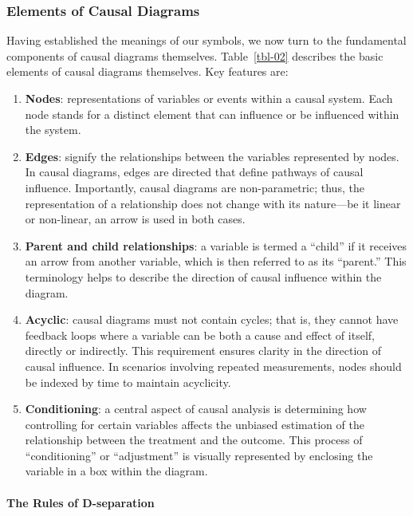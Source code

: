 \documentclass[
  singlecolumn]{article}
\let\oldparagraph\paragraph
\renewcommand{\paragraph}[1]{\oldparagraph{#1}\mbox{}}
\begin{document}
\subsubsection{Elements of Causal
Diagrams}\label{elements-of-causal-diagrams}

Having established the meanings of our symbols, we now turn to the
fundamental components of causal diagrams themselves. Table~\ref{tbl-02}
describes the basic elements of causal diagrams themselves. Key features
are:

\begin{enumerate}
\def\labelenumi{\arabic{enumi}.}
\item
  \textbf{Nodes}: representations of variables or events within a causal
  system. Each node stands for a distinct element that can influence or
  be influenced within the system.
\item
  \textbf{Edges}: signify the relationships between the variables
  represented by nodes. In causal diagrams, edges are directed that
  define pathways of causal influence. Importantly, causal diagrams are
  non-parametric; thus, the representation of a relationship does not
  change with its nature---be it linear or non-linear, an arrow is used
  in both cases.
\item
  \textbf{Parent and child relationships}: a variable is termed a
  ``child'' if it receives an arrow from another variable, which is then
  referred to as its ``parent.'' This terminology helps to describe the
  direction of causal influence within the diagram.
\item
  \textbf{Acyclic}: causal diagrams must not contain cycles; that is,
  they cannot have feedback loops where a variable can be both a cause
  and effect of itself, directly or indirectly. This requirement ensures
  clarity in the direction of causal influence. In scenarios involving
  repeated measurements, nodes should be indexed by time to maintain
  acyclicity.
\item
  \textbf{Conditioning}: a central aspect of causal analysis is
  determining how controlling for certain variables affects the unbiased
  estimation of the relationship between the treatment and the outcome.
  This process of ``conditioning'' or ``adjustment'' is visually
  represented by enclosing the variable in a box within the diagram.
\end{enumerate}

\paragraph{The Rules of D-separation}\label{the-rules-of-d-separation}
\end{document}
